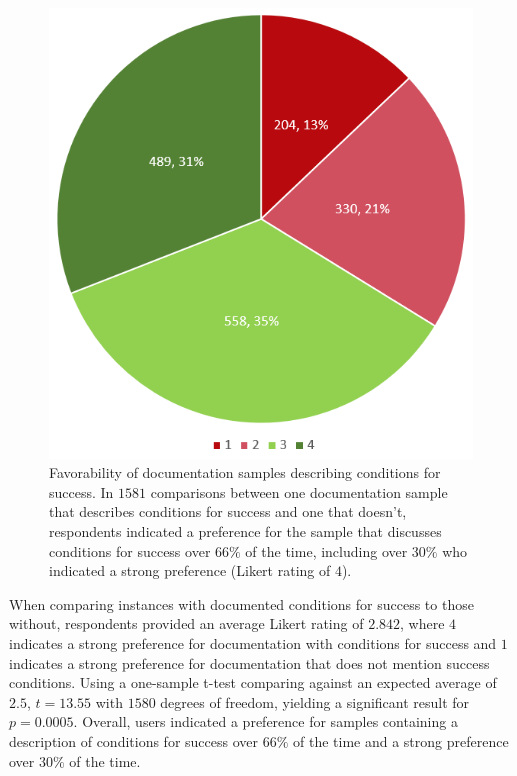 \documentclass[preprint]{sigplanconf}
\begin{document}
\begin{figure}
	\begin{center}
	\end{center}
	\includegraphics[width=\columnwidth]{conditions-for-success-likert.png}
	\caption{Favorability of documentation samples describing conditions for success. In \(1581\) comparisons between one documentation sample that describes conditions for success and one that doesn't, respondents indicated a preference for the sample that discusses conditions for success over \(66\%\) of the time, including over \(30\%\) who indicated a strong preference (Likert rating of \(4\)).}
	\label{figure-cfs}
\end{figure}

When comparing instances with documented conditions for success to those without, respondents provided an average Likert rating of \(2.842\), where \(4\) indicates a strong preference for documentation with conditions for success and \(1\) indicates a strong preference for documentation that does not mention success conditions. Using a one-sample t-test comparing against an expected average of \(2.5\), \(t = 13.55\) with \(1580\) degrees of freedom, yielding a significant result for \(p = 0.0005\). Overall, users indicated a preference for samples containing a description of conditions for success over \(66\%\) of the time and a strong preference over \(30\%\) of the time.
\end{document}
